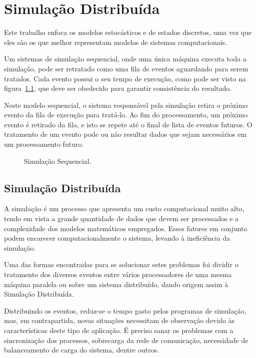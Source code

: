 \chapter{Simulação Distribuída}

Este trabalho enfoca os modelos estocásticos e de estados discretos, uma vez que eles são os que melhor representam modelos de sistemas computacionais.

Um sistemas de simulação sequencial, onde uma única máquina executa toda a simulação, pode ser retratado como uma fila de eventos aguardando para serem tratados. Cada evento possui o seu tempo de execução, como pode ser visto na figura~\ref{fig:simul}, que deve ser obedecido para garantir consistência do resultado.

Neste modelo sequencial, o sistema responsável pela simulação retira o próximo evento da fila de execução para tratá-lo. Ao fim do processamento, um próximo evento é retirado da fila, e isto se repete até o final de lista de eventos futuros. O tratamento de um evento pode ou não resultar dados que sejam necessários em um processamento futuro.

\begin{figure}
  \caption{Simulação Sequencial.}
\label{fig:simul}
\end{figure}

\section{Simulação Distribuída}
A simulação é um processo que apresenta um custo computacional muito alto, tendo em vista a grande quantidade de dados que devem ser processados e a complexidade dos modelos matemáticos empregados. Esses fatores em conjunto podem encarecer computacionalmente o sistema, levando à ineficiência da simulação.

Uma das formas encontradas para se solucionar estes problemas foi dividir o tratamento dos diversos eventos entre vários processadores de uma mesma máquina paralela ou sobre um sistema distribuído, dando origem assim à Simulação Distribuída.

Distribuindo os eventos, reduz-se o tempo gasto pelos programas de simulação, mas, em contrapartida, novas situações necessitam de observação devido às características deste tipo de aplicação. É preciso sanar os problemas com a sincronização dos processos, sobrecarga da rede de comunicação, necessidade de balanceamento de carga do sistema, dentre outros.

